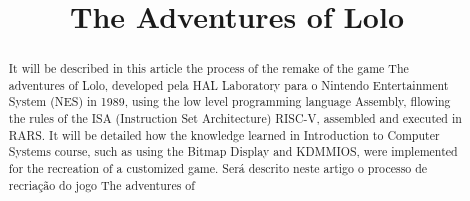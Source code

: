 \documentclass[10pt, conference, compsocconf]{IEEEtran}
\begin{document}
\title{The Adventures of Lolo}


\author{
}







\maketitle

\begin{abstract}
  It will be described in this article the process of the remake of the game The
  adventures of Lolo, developed pela HAL Laboratory para o Nintendo
  Entertainment System (NES) in 1989, using the low level programming language
  Assembly, fllowing the rules of the ISA (Instruction Set Architecture) RISC-V,
  assembled and executed in RARS. It will be detailed how the knowledge learned
  in Introduction to Computer Systems course, such as using the Bitmap Display
  and KDMMIOS, were implemented for the recreation of a customized game. Será
  descrito neste artigo o processo de recriação do jogo The adventures of

\end{abstract}
\end{document}
